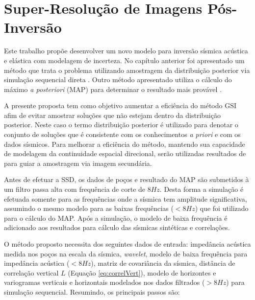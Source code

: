 \chapter{Super-Resolução de Imagens Pós-Inversão}
\label{cap:3modeloHibrido}


Este trabalho propõe desenvolver um novo modelo para inversão sísmica acústica e
elástica com modelagem de incerteza. No capítulo anterior foi apresentado um
método que trata o problema utilizando amostragem da distribuição posterior via
simulação sequencial direta \citep{amilcarInversao}. Outro método apresentado
utiliza o cálculo do máximo \textit{a posteriori} (MAP) para determinar o
resultado mais provável \citep{Buland01012003}.

A presente proposta tem como objetivo aumentar a eficiência do método GSI
\citep{amilcarInversao} afim de evitar amostrar soluções que não estejam dentro
da distribuição posterior. Neste caso o termo distribuição posterior é utilizado
para denotar o conjunto de soluções que é consistente com os conhecimentos
\textit{a priori} e com os dados sísmicos. Para melhorar a eficiência do método,
mantendo sua capacidade de modelagem da continuidade espacial direcional, serão
utilizadas resultados de \cite{Buland01012003} para guiar a amostragem via
imagem secundária.

Antes de efetuar a SSD, os dados de poços e resultado do MAP são submetidos à um
filtro passa alta com frequência de corte de $8Hz$. Desta forma a simulação é
efetuada somente para as frequências onde a sísmica tem amplitude significativa,
assumindo o mesmo modelo para as baixas frequências ($<8Hz$) que foi utilizado
para o cálculo do MAP. Após a simulação, o modelo de baixa frequência é
adicionado aos resultados para cálculo das sísmicas sintéticas e correlações.

O método proposto necessita dos seguintes dados de entrada: impedância acústica
medida nos poços na escala da sísmica, \textit{wavelet}, modelo de baixa
frequência para impedância acústica ($<8Hz$), matriz de covariância da sísmica,
distância de correlação vertical $L$ (Equação \ref{eq:correlVert}), modelo de
horizontes e variogramas verticais e horizontais modelados nos dados filtrados
($>8Hz$) para simulação sequencial. Resumindo, os principais passos são:


